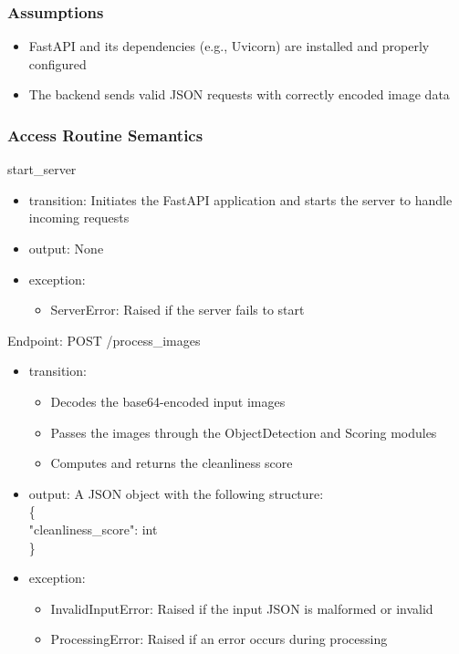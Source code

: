 \documentclass[12pt, titlepage]{article}
\begin{document}
\subsubsection{Assumptions}
\begin{itemize}
  \item FastAPI and its dependencies (e.g., Uvicorn) are installed and properly configured
  \item The backend sends valid JSON requests with correctly encoded image data
\end{itemize}


\subsubsection{Access Routine Semantics}

\noindent start{\_}server
\begin{itemize}
\item transition: Initiates the FastAPI application and starts the server to handle incoming requests
\item output: None
\item exception: 
\begin{itemize}
  \item ServerError: Raised if the server fails to start
\end{itemize}

\end{itemize}

\noindent Endpoint: POST /process{\_}images
\begin{itemize}
\item transition:
\begin{itemize}
  \item Decodes the base64-encoded input images
  \item Passes the images through the ObjectDetection and Scoring modules
  \item Computes and returns the cleanliness score
\end{itemize}
\item output: A JSON object with the following structure: \\ \{ \\"cleanliness{\_}score": int\\ \}
\item exception: 
\begin{itemize}
  \item InvalidInputError: Raised if the input JSON is malformed or invalid
  \item ProcessingError: Raised if an error occurs during processing
\end{itemize}

\end{itemize}
\end{document}
